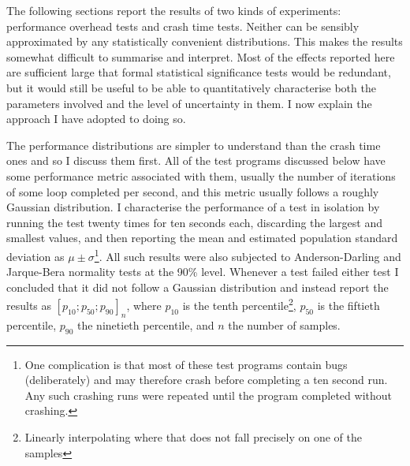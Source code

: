 The following sections report the results of two kinds of experiments:
performance overhead tests and crash time tests.  Neither can be
sensibly approximated by any statistically convenient distributions.
This makes the results somewhat difficult to summarise and interpret.
Most of the effects reported here are sufficient large that formal
statistical significance tests would be redundant, but it would still
be useful to be able to quantitatively characterise both the
parameters involved and the level of uncertainty in them.  I now
explain the approach I have adopted to doing so.

The performance distributions are simpler to understand than the crash
time ones and so I discuss them first.  All of the test programs
discussed below have some performance metric associated with them,
usually the number of iterations of some loop completed per second,
and this metric usually follows a roughly Gaussian distribution.  I
characterise the performance of a test in isolation by running the
test twenty times for ten seconds each, discarding the largest and
smallest values, and then reporting the mean and estimated population
standard deviation as $\mu \pm \sigma$\footnote{One complication is
that most of these test programs contain bugs (deliberately) and may
therefore crash before completing a ten second run.  Any such crashing
runs were repeated until the program completed without crashing.}.
All such results were also subjected to Anderson-Darling and
Jarque-Bera normality tests at the 90\% level.  Whenever a test failed
either test I concluded that it did not follow a Gaussian distribution
and instead report the results as $[p_{10};p_{50};p_{90}]_n$, where
$p_{10}$ is the tenth percentile\footnote{Linearly interpolating where
that does not fall precisely on one of the samples}, $p_{50}$ is the
fiftieth percentile, $p_{90}$ the ninetieth percentile, and $n$ the
number of samples.

